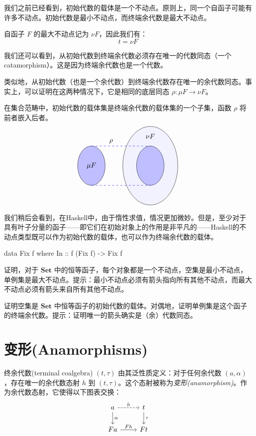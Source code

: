 \documentclass[DaoFP]{subfiles}
\begin{document}
我们之前已经看到，初始代数的载体是一个不动点。原则上，同一个自函子可能有许多不动点。初始代数是最小不动点，而终端余代数是最大不动点。

自函子 $F$ 的最大不动点记为 $\nu F$，因此我们有：
\[ t = \nu F \]

我们还可以看到，从初始代数到终端余代数必须存在唯一的代数同态（一个catamorphism）。这是因为终端余代数也是一个代数。

类似地，从初始代数（也是一个余代数）到终端余代数存在唯一的余代数同态。事实上，可以证明在这两种情况下，它是相同的底层同态 $\rho \colon \mu F \to \nu F$。

在集合范畴中，初始代数的载体集是终端余代数的载体集的一个子集，函数 $\rho$ 将前者嵌入后者。
\[
\begin{tikzpicture}
         \draw (-1,0)[fill=blue!25!white] ellipse (0.7 and 1);
         \draw (2,0)[fill=blue!5!white] ellipse (1.4 and 2);
         \draw (2,0)[fill=blue!25!white] ellipse (0.7 and 1);
         \node[above] at (0, 1) {$\rho$};
       	\draw[dashed, blue] (-1, 1) -- (2, 1);
	\draw[dashed, blue] (-1, -1) -- (2, -1);
        \node at (-1, 0) { $\mu F$ };
        \node at (2, 1.5) { $\nu F$ };
\end{tikzpicture}
\]

我们稍后会看到，在Haskell中，由于惰性求值，情况更加微妙。但是，至少对于具有叶子分量的函子——即它们在初始对象上的作用是非平凡的——Haskell的不动点类型既可以作为初始代数的载体，也可以作为终端余代数的载体。
\begin{haskell}
data Fix f where
  In :: f (Fix f) -> Fix f
\end{haskell}

\begin{exercise}
证明，对于 $\mathbf{Set}$ 中的恒等函子，每个对象都是一个不动点，空集是最小不动点，单例集是最大不动点。提示：最小不动点必须有箭头指向所有其他不动点，而最大不动点必须有箭头来自所有其他不动点。
\end{exercise}

\begin{exercise}
证明空集是 $\mathbf{Set}$ 中恒等函子的初始代数的载体。对偶地，证明单例集是这个函子的终端余代数。提示：证明唯一的箭头确实是（余）代数同态。
\end{exercise}

\section{变形(Anamorphisms)}

终余代数(terminal coalgebra) $(t, \tau)$ 由其泛性质定义：对于任何余代数 $(a, \alpha)$，存在唯一的余代数态射 $h$ 到 $(t, \tau)$。这个态射被称为\emph{变形(anamorphism)}。作为余代数态射，它使得以下图表交换：
\[
 \begin{tikzcd}
 a 
 \arrow[r, dashed, "h"]
 \arrow[d, "\alpha"]
 & t
\arrow[d, "\tau"]
 \\
 F a
 \arrow[r,  "F h"]
 & F t
  \end{tikzcd}
\]
 
\end{document}
